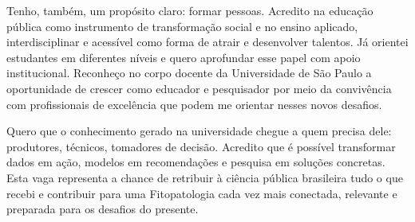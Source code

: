 \documentclass[12pt,a4paper,oneside]{book}
\newcommand{\USP}{Universidade de São Paulo}
\begin{document}
Tenho, também, um propósito claro: formar pessoas. Acredito na educação pública como instrumento de 
transformação social e no ensino aplicado, interdisciplinar e acessível como forma de atrair e 
desenvolver talentos. Já orientei estudantes em diferentes níveis e quero aprofundar esse
papel com apoio institucional. Reconheço no corpo docente da \USP{} a oportunidade de crescer como educador e 
pesquisador por meio da convivência com profissionais de excelência que podem me orientar nesses novos desafios.

Quero que o conhecimento gerado na universidade chegue a quem precisa dele: produtores, técnicos, tomadores de 
decisão. Acredito que é possível transformar dados em ação, modelos em recomendações e pesquisa em soluções 
concretas. Esta vaga representa a chance de retribuir à ciência pública brasileira tudo o que recebi e 
contribuir para uma Fitopatologia cada vez mais conectada, relevante e preparada para os desafios do presente.

\backmatter


\end{document}
